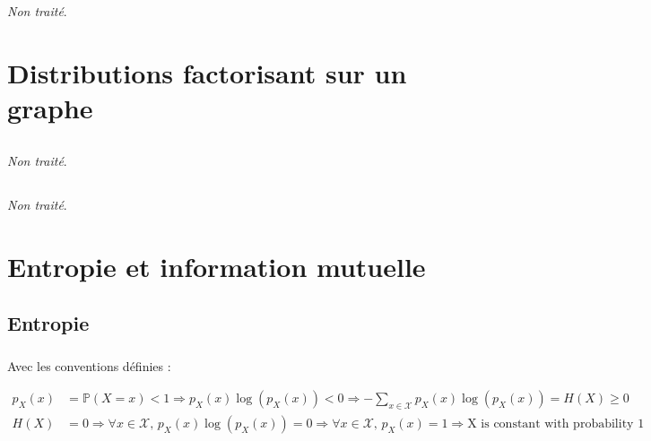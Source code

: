 \documentclass[12pt,a4paper,onecolumn]{article}
\begin{document}
\subsection{}

\textit{Non traité}.

\section{Distributions factorisant sur un graphe}

\subsection{}
\textit{Non traité}.

\subsection{}
\textit{Non traité}.

\clearpage

\section{Entropie et information mutuelle}

\subsection{Entropie}

\subsubsection{}

Avec les conventions définies :

\begin{equation}
	\begin{split}
		p_X(x) &= \mathbb{P}(X = x) < 1 \Rightarrow p_X(x)\log(p_X(x)) < 0 \Rightarrow -\sum_{x \in \mathcal{X}} p_X(x)\log(p_X(x)) = H(X) \geq 0 \\
		H(X) &= 0 \Rightarrow \forall x \in \mathcal{X},\, p_X(x)\log(p_X(x)) = 0 \Rightarrow \forall x \in \mathcal{X},\, p_X(x) = 1 \Rightarrow \text{X is constant with probability 1}
	\end{split}
	\label{eq_31a}
\end{equation}

\subsubsection{}
\end{document}
